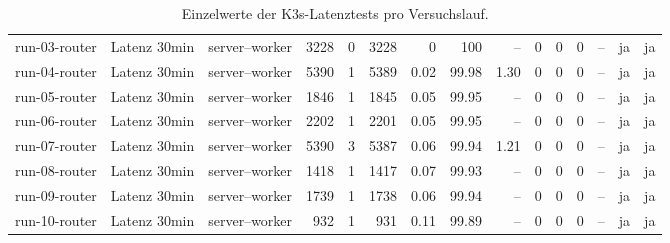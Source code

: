 \begin{table}
{\begin{tabular}{l l p{3.2cm} r r r r r r r r r r r r}
run-03-router & Latenz 30min & server--worker & 3228 & 0 & 3228 & 0 & 100 & -- & 0 & 0 & 0 & -- & ja & ja \\
run-04-router & Latenz 30min & server--worker & 5390 & 1 & 5389 & 0.02 & 99.98 & 1.30 & 0 & 0 & 0 & -- & ja & ja \\
run-05-router & Latenz 30min & server--worker & 1846 & 1 & 1845 & 0.05 & 99.95 & -- & 0 & 0 & 0 & -- & ja & ja \\
run-06-router & Latenz 30min & server--worker & 2202 & 1 & 2201 & 0.05 & 99.95 & -- & 0 & 0 & 0 & -- & ja & ja \\
run-07-router & Latenz 30min & server--worker & 5390 & 3 & 5387 & 0.06 & 99.94 & 1.21 & 0 & 0 & 0 & -- & ja & ja \\
run-08-router & Latenz 30min & server--worker & 1418 & 1 & 1417 & 0.07 & 99.93 & -- & 0 & 0 & 0 & -- & ja & ja \\
run-09-router & Latenz 30min & server--worker & 1739 & 1 & 1738 & 0.06 & 99.94 & -- & 0 & 0 & 0 & -- & ja & ja \\
run-10-router & Latenz 30min & server--worker & 932 & 1 & 931 & 0.11 & 99.89 & -- & 0 & 0 & 0 & -- & ja & ja \\
\bottomrule
\end{tabular}%
}
\caption{Einzelwerte der K3s-Latenztests pro Versuchslauf.}
\label{tab:appendix-k3s-latency-runs}
\end{table}
